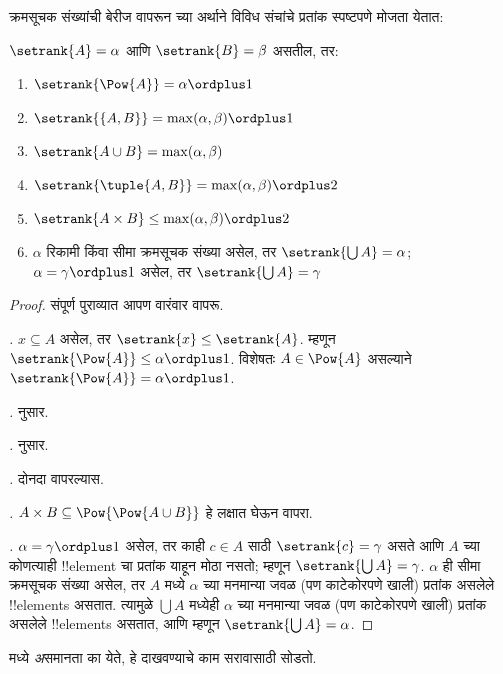 \documentclass[../../../include/open-logic-section]{subfiles}
\begin{document}

क्रमसूचक संख्यांची बेरीज वापरून  च्या अर्थाने विविध संचांचे प्रतांक स्पष्टपणे मोजता येतात:

\begin{lem}
$\setrank{A} = \alpha$ आणि $\setrank{B} = \beta$ असतील, तर:
\begin{enumerate}
  \item{} $\setrank{\Pow{A}} = \alpha\ordplus 1$
  \item{} $\setrank{\{A, B\}} = \max(\alpha,
  \beta) \ordplus 1$
  \item{} $\setrank{A \cup B} = \max(\alpha,
  \beta)$
  \item{} $\setrank{\tuple{A,B}} = \max(\alpha,
  \beta) \ordplus  2$
  \item{} $\setrank{A \times B} \leq \max(\alpha,
  \beta) \ordplus  2$
  \item{} $\alpha$ रिकामी किंवा सीमा क्रमसूचक संख्या असेल, तर $\setrank{\bigcup A} = \alpha$; $\alpha = \gamma\ordplus 1$ असेल, तर $\setrank{\bigcup A} = \gamma$
\end{enumerate}
\end{lem}

\begin{proof}
संपूर्ण पुराव्यात आपण  वारंवार वापरू.

\emph{.} $x \subseteq A$ असेल, तर $\setrank{x} \leq
\setrank{A}$. म्हणून $\setrank{\Pow{A}} \leq \alpha \ordplus  1$. विशेषतः $A
\in \Pow{A}$ असल्याने $\setrank{\Pow{A}} = \alpha \ordplus  1$.

\emph{.}  नुसार.

\emph{.}  नुसार.

\emph{.}  दोनदा वापरल्यास.

\emph{.} $A \times B \subseteq
\Pow{\Pow{A \cup B}}$ हे लक्षात घेऊन  वापरा.

\emph{.} $\alpha = \gamma\ordplus 1$ असेल, तर काही $c \in A$ साठी $\setrank{c} = \gamma$ असते आणि $A$ च्या कोणत्याही !!{element} चा प्रतांक याहून मोठा नसतो; म्हणून $\setrank{\bigcup A} = \gamma$. $\alpha$ ही सीमा क्रमसूचक संख्या असेल, तर $A$ मध्ये $\alpha$ च्या मनमान्या जवळ (पण काटेकोरपणे खाली) प्रतांक असलेले !!{element}s असतात. त्यामुळे $\bigcup A$ मध्येही $\alpha$ च्या मनमान्या जवळ (पण काटेकोरपणे खाली) प्रतांक असलेले !!{element}s असतात, आणि म्हणून $\setrank{\bigcup A} = \alpha$.
\end{proof}
\noindent
{} मध्ये \emph{अ}समानता का येते, हे दाखवण्याचे काम सरावासाठी सोडतो.
\end{document}

